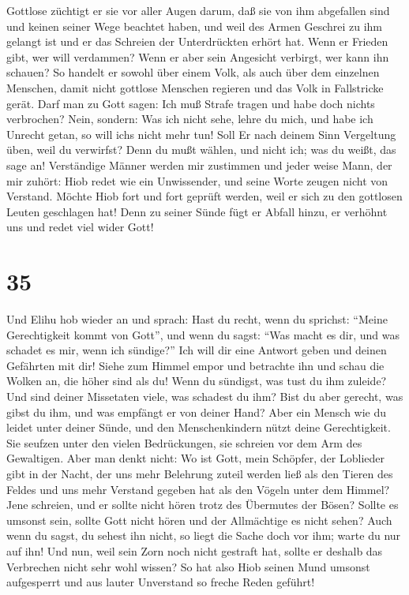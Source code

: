 Gottlose züchtigt er sie vor aller Augen darum,  daß sie
von ihm abgefallen sind und keinen seiner Wege beachtet haben,
 und weil des Armen Geschrei zu ihm gelangt ist und er
das Schreien der Unterdrückten erhört hat.  Wenn er
Frieden gibt, wer will verdammen? Wenn er aber sein Angesicht verbirgt,
wer kann ihn schauen? So handelt er sowohl über einem Volk, als auch
über dem einzelnen Menschen,  damit nicht gottlose
Menschen regieren und das Volk in Fallstricke gerät. 
Darf man zu Gott sagen: Ich muß Strafe tragen und habe doch nichts
verbrochen?  Nein, sondern: Was ich nicht sehe, lehre du
mich, und habe ich Unrecht getan, so will ich\textquotesingle s nicht
mehr tun!  Soll Er nach deinem Sinn Vergeltung üben, weil
du verwirfst? Denn du mußt wählen, und nicht ich; was du weißt, das sage
an!  Verständige Männer werden mir zustimmen und jeder
weise Mann, der mir zuhört:  Hiob redet wie ein
Unwissender, und seine Worte zeugen nicht von Verstand. 
Möchte Hiob fort und fort geprüft werden, weil er sich zu den gottlosen
Leuten geschlagen hat!  Denn zu seiner Sünde fügt er
Abfall hinzu, er verhöhnt uns und redet viel wider Gott!

\hypertarget{section-34}{%
\section{35}\label{section-34}}

 Und Elihu hob wieder an und sprach:  Hast
du recht, wenn du sprichst: ``Meine Gerechtigkeit kommt von Gott'',
 und wenn du sagst: ``Was macht es dir, und was schadet es
mir, wenn ich sündige?''  Ich will dir eine Antwort geben
und deinen Gefährten mit dir!  Siehe zum Himmel empor und
betrachte ihn und schau die Wolken an, die höher sind als du!
 Wenn du sündigst, was tust du ihm zuleide? Und sind
deiner Missetaten viele, was schadest du ihm?  Bist du
aber gerecht, was gibst du ihm, und was empfängt er von deiner Hand?
 Aber ein Mensch wie du leidet unter deiner Sünde, und den
Menschenkindern nützt deine Gerechtigkeit.  Sie seufzen
unter den vielen Bedrückungen, sie schreien vor dem Arm des Gewaltigen.
 Aber man denkt nicht: Wo ist Gott, mein Schöpfer, der
Loblieder gibt in der Nacht,  der uns mehr Belehrung
zuteil werden ließ als den Tieren des Feldes und uns mehr Verstand
gegeben hat als den Vögeln unter dem Himmel?  Jene
schreien, und er sollte nicht hören trotz des Übermutes der Bösen?
 Sollte es umsonst sein, sollte Gott nicht hören und der
Allmächtige es nicht sehen?  Auch wenn du sagst, du
sehest ihn nicht, so liegt die Sache doch vor ihm; warte du nur auf ihn!
 Und nun, weil sein Zorn noch nicht gestraft hat, sollte
er deshalb das Verbrechen nicht sehr wohl wissen?  So hat
also Hiob seinen Mund umsonst aufgesperrt und aus lauter Unverstand so
freche Reden geführt!

